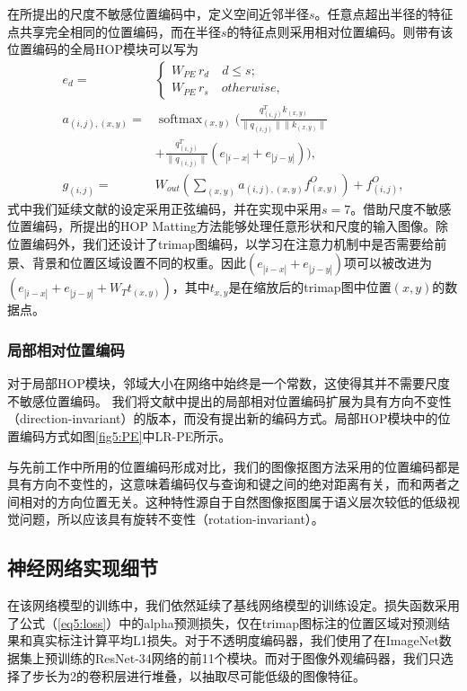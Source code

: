 在所提出的尺度不敏感位置编码中，定义空间近邻半径$s$。任意点超出半径的特征点共享完全相同的位置编码，而在半径$s$的特征点则采用相对位置编码。则带有该位置编码的全局HOP模块可以写为
\begin{equation}
\begin{aligned}
e_d =& \begin{cases} W_{PE}\,r_d  \quad d\le s;\\ W_{PE}\,r_s   \quad otherwise,\end{cases} \\
a_{(i,j),(x,y)} =& \mathop{\mathrm{softmax}}_{(x,y)}(\frac{q_{(i,j)}^Tk_{(x,y)}}{\|q_{(i,j)}\|\|k_{(x,y)}\|}\\ & + \frac{q_{(i,j)}^T}{\|q_{(i,j)}\|}(e_{|i-x|}+e_{|j-y|})),\\
g_{(i,j)} =& W_{out}(\sum_{(x,y)}a_{(i,j),(x,y)}f^O_{(x,y)}) + f^O_{(i,j)},
\end{aligned}
\end{equation}
式中我们延续文献\parencite{vaswani2017attention,dai2019transformer}的设定采用正弦编码，并在实现中采用$s=7$。借助尺度不敏感位置编码，所提出的HOP Matting方法能够处理任意形状和尺度的输入图像。除位置编码外，我们还设计了trimap图编码，以学习在注意力机制中是否需要给前景、背景和位置区域设置不同的权重。因此$(e_{|i-x|}+e_{|j-y|})$项可以被改进为$(e_{|i-x|}+e_{|j-y|}+W_{T}t_{(x,y)})$，其中$t_{x,y}$是在缩放后的trimap图中位置$(x,y)$的数据点。

\subsubsection{局部相对位置编码}
对于局部HOP模块，邻域大小在网络中始终是一个常数，这使得其并不需要尺度不敏感位置编码。
我们将文献\parencite{ramachandran2019stand}中提出的局部相对位置编码扩展为具有方向不变性（direction-invariant）的版本，而没有提出新的编码方式。局部HOP模块中的位置编码方式如图\ref{fig5:PE}中LR-PE所示。

与先前工作中所用的位置编码\cite{vaswani2017attention,dai2019transformer,ramachandran2019stand}形成对比，我们的图像抠图方法采用的位置编码都是具有方向不变性的，这意味着编码仅与查询和键之间的绝对距离有关，而和两者之间相对的方向位置无关。这种特性源自于自然图像抠图属于语义层次较低的低级视觉问题，所以应该具有旋转不变性（rotation-invariant）。

\subsection{神经网络实现细节}

在该网络模型的训练中，我们依然延续了基线网络模型的训练设定。损失函数采用了公式（\ref{eq5:loss}）中的alpha预测损失，仅在trimap图标注的位置区域对预测结果和真实标注计算平均L1损失。对于不透明度编码器，我们使用了在ImageNet数据集\cite{russakovsky2015imagenet}上预训练的ResNet-34网络\cite{he2016deep}的前11个模块。而对于图像外观编码器，我们只选择了步长为2的卷积层进行堆叠，以抽取尽可能低级的图像特征。

